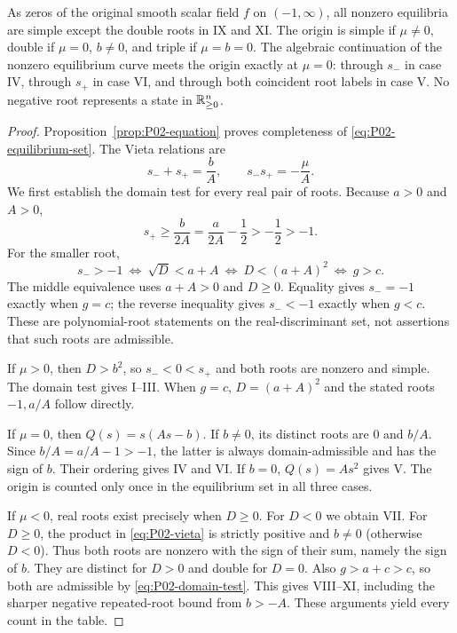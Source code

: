 \begin{theorem}
As zeros of the original smooth scalar field $f$ on $(-1,\infty)$,
all nonzero equilibria are simple except the double roots in IX and XI.
The origin is simple if $\mu\ne0$, double if $\mu=0$, $b\ne0$,
and triple if $\mu=b=0$. The algebraic continuation of the nonzero
equilibrium curve meets the origin exactly at $\mu=0$: through $s_-$
in case IV, through $s_+$ in case VI, and through both coincident
root labels in case V. No negative root represents a state in $\mathbb{R}_{\geq 0}^{n}$.
\end{theorem}

\begin{proof}
Proposition~\ref{prop:P02-equation} proves completeness of
\eqref{eq:P02-equilibrium-set}. The Vieta relations are
\begin{equation}
\label{eq:P02-vieta}
 s_-+s_+=\frac bA,\qquad s_-s_+=-\frac\mu A.
\end{equation}
We first establish the domain test for every real pair of roots.
Because $a>0$ and $A>0$,
\[
 s_+\ge\frac b{2A}=\frac a{2A}-\frac12>-\frac12>-1.
\]
For the smaller root,
\begin{equation}
\label{eq:P02-domain-test}
 s_->-1
 \ \Longleftrightarrow\ \sqrt D<a+A
 \ \Longleftrightarrow\ D<(a+A)^2
 \ \Longleftrightarrow\ g>c.
\end{equation}
The middle equivalence uses $a+A>0$ and $D\ge0$. Equality gives
$s_-=-1$ exactly when $g=c$; the reverse inequality gives $s_-<-1$
exactly when $g<c$. These are polynomial-root statements on the
real-discriminant set, not assertions that such roots are admissible.

If $\mu>0$, then $D>b^2$, so $s_-<0<s_+$ and both roots are
nonzero and simple. The domain test gives I--III. When $g=c$,
$D=(a+A)^2$ and the stated roots $-1,a/A$ follow directly.

If $\mu=0$, then $Q(s)=s(As-b)$. If $b\ne0$, its distinct roots
are $0$ and $b/A$. Since $b/A=a/A-1>-1$, the latter is always
domain-admissible and has the sign of $b$. Their ordering gives
IV and VI. If $b=0$, $Q(s)=As^2$ gives V. The origin is counted
only once in the equilibrium set in all three cases.

If $\mu<0$, real roots exist precisely when $D\ge0$. For $D<0$
we obtain VII. For $D\ge0$, the product in \eqref{eq:P02-vieta}
is strictly positive and $b\ne0$ (otherwise $D<0$). Thus both
roots are nonzero with the sign of their sum, namely the sign of $b$.
They are distinct for $D>0$ and double for $D=0$. Also
$g>a+c>c$, so both are admissible by \eqref{eq:P02-domain-test}.
This gives VIII--XI, including the sharper negative repeated-root
bound from $b>-A$. These arguments yield every count in the table.


\end{proof}
